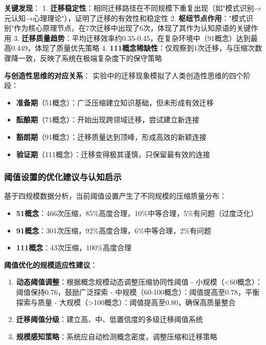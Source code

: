 \documentclass[12pt,a4paper]{article}
\begin{document}
\textbf{关键发现}：
1. \textbf{迁移稳定性}：相同迁移路径在不同规模下重复出现（如"模式识别→元认知→心理理论"），证明了迁移的有效性和稳定性
2. \textbf{枢纽节点作用}："模式识别"作为核心原理节点，在7次迁移中出现了6次，体现了其作为认知原语的关键作用
3. \textbf{迁移质量趋势}：平均迁移效率约0.35-0.45，在复杂环境中（91概念）达到最高0.449，体现了质量优先策略
4. \textbf{111概念稀缺性}：仅观察到1次迁移，与压缩次数骤降一致，反映了系统在极端复杂度下的保守策略

\textbf{与创造性思维的对应关系}：
实验中的迁移现象模拟了人类创造性思维的四个阶段：
\begin{itemize}
\item \textbf{准备期}（51概念）：广泛压缩建立知识基础，但未形成有效迁移
\item \textbf{酝酿期}（71概念）：开始出现跨领域迁移，尝试建立新连接
\item \textbf{豁朗期}（91概念）：迁移质量达到顶峰，形成高效的新颖连接
\item \textbf{验证期}（111概念）：迁移变得极其谨慎，只保留最有效的连接
\end{itemize}

\subsubsection{阈值设置的优化建议与认知启示}

基于四规模数据分析，当前阈值设置产生了不同规模的压缩质量分布：

\begin{itemize}
\item \textbf{51概念}：466次压缩，85\%高度合理，10\%中等合理，5\%有问题（过度泛化）
\item \textbf{91概念}：301次压缩，92\%高度合理，6\%中等合理，2\%有问题
\item \textbf{111概念}：43次压缩，100\%高度合理
\end{itemize}

\textbf{阈值优化的规模适应性建议}：
\begin{enumerate}
\item \textbf{动态阈值调整}：根据概念规模动态调整压缩协同性阈值
  - 小规模（<60概念）：阈值保持0.76，鼓励广泛探索
  - 中规模（60-100概念）：阈值提高至0.78，平衡探索与质量
  - 大规模（>100概念）：阈值提高至0.80，确保高质量整合
\item \textbf{迁移阈值分级}：建立高、中、低置信度的多级迁移阈值系统
\item \textbf{规模感知策略}：系统应自动检测概念密度，调整压缩和迁移策略
\end{enumerate}
\end{document}

